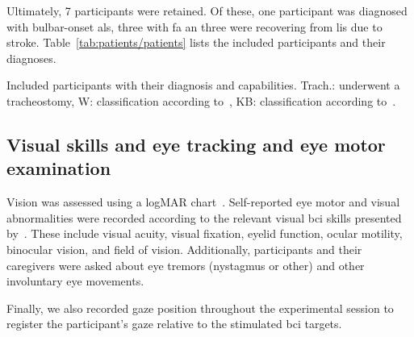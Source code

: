 \documentclass[twocolumn]{article}
\newcommand{\skill}{{\color{gdvGreen}{$\boldsymbol{+}$}}}
\newcommand{\noskill}{{\color{gdvOrange}{$\boldsymbol{-}$}}}
\newcommand{\snoskill}{{\color{gdvRed}{$\boldsymbol{/}$}}}
\begin{document}
Ultimately, 7 participants were retained.
Of these, one participant was diagnosed with bulbar-onset \ac{als}, three with
\ac{fa} an three were recovering from \ac{lis} due to stroke.
Table~\ref{tab:patients/patients} lists the included participants and their
diagnoses.
\begin{table}[t]
  \centering
  \footnotesize
  
  \caption[Included participants with their diagnosis and
    capabilities.]{Included participants with their diagnosis and
    capabilities.
    Trach.: underwent a tracheostomy, W: classification according
    to~\textcite{Wolpaw2006}, KB: classification according
    to~\textcite{Kuebler2008}.
  }
  \label{tab:patients/patients}
\end{table}

\subsection{Visual skills and eye tracking and eye motor examination}

Vision was assessed using a logMAR chart~\cite{Bailey1976}.
Self-reported eye motor and visual abnormalities were recorded according to the
relevant visual \ac{bci} skills presented by~\textcite{FriedOken2020}.
These include visual acuity, visual fixation, eyelid function, ocular motility,
binocular vision, and field of vision.
Additionally, participants and their caregivers were asked about eye tremors
(nystagmus or other) and other involuntary eye movements.


\begin{table}[t]
  \footnotesize
  \centering
  
  \caption[Visual skills of the included participants.]{%
    Self-reported visual skills as defined by \textcite{FriedOken2020} of the included participants.
  \skill\ skilled, \noskill\ impaired, \snoskill\ severely impaired.
  Visual acuity was assessed using the logMAR scale (lower is better).}
  \label{tab:patients/eye}
\end{table}

Finally, we also recorded gaze position throughout the experimental session to
register the participant's gaze relative to the stimulated \ac{bci} targets.
\end{document}

